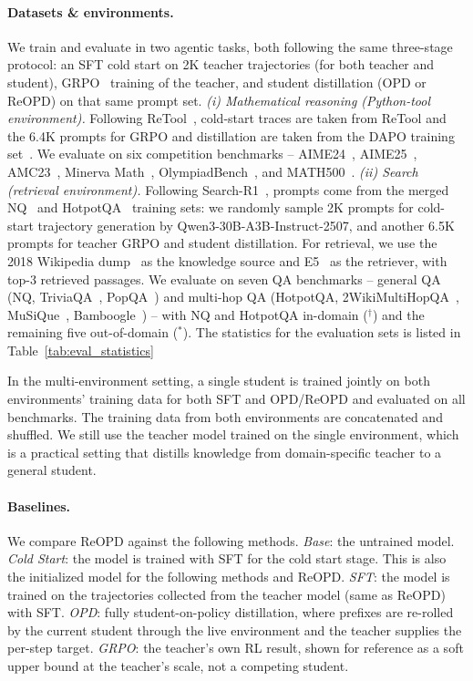 \noindent\paragraph{Datasets \& environments.}
We train and evaluate in two agentic tasks, both following the same three-stage protocol: an SFT cold start on 2K teacher trajectories (for both teacher and student), GRPO~\citep{shao2024deepseekmath} training of the teacher, and student distillation (OPD or ReOPD) on that same prompt set. \emph{(i) Mathematical reasoning (Python-tool environment).} Following ReTool~\citep{feng2025retool}, cold-start traces are taken from ReTool and the 6.4K prompts for GRPO and distillation are taken from the DAPO training set~\citep{yu2025dapo}. We evaluate on six competition benchmarks -- AIME24~\citep{aime24}, AIME25~\citep{aime25}, AMC23~\citep{li2024numinamath}, Minerva Math~\citep{lewkowycz2022minerva}, OlympiadBench~\citep{he2024olympiadbench}, and MATH500~\citep{hendrycks2021math500}. \emph{(ii) Search (retrieval environment).} Following Search-R1~\citep{jin2025search}, prompts come from the merged NQ~\citep{kwiatkowski2019nq} and HotpotQA~\citep{yang2018hotpotqa} training sets: we randomly sample 2K prompts for cold-start trajectory generation by Qwen3-30B-A3B-Instruct-2507, and another 6.5K prompts for teacher GRPO and student distillation. For retrieval, we use the 2018 Wikipedia dump~\citep{karpukhin2020dense} as the knowledge source and E5~\citep{wang2022text} as the retriever, with top-3 retrieved passages. We evaluate on seven QA benchmarks -- general QA (NQ, TriviaQA~\citep{joshi2017triviaqa}, PopQA~\citep{mallen2023popqa}) and multi-hop QA (HotpotQA, 2WikiMultiHopQA~\citep{ho2020twowiki}, MuSiQue~\citep{trivedi2022musique}, Bamboogle~\citep{press2023bamboogle}) -- with NQ and HotpotQA in-domain ($^\dagger$) and the remaining five out-of-domain ($^*$). The statistics for the evaluation sets is listed in Table~\ref{tab:eval_statistics}

In the multi-environment setting, a single student is trained jointly on both environments' training data for both SFT and OPD/ReOPD and evaluated on all benchmarks. The training data from both environments are concatenated and shuffled. We still use the teacher model trained on the single environment, which is a practical setting that distills knowledge from domain-specific teacher to a general student.


\noindent\paragraph{Baselines.}
We compare ReOPD against the following methods. \emph{Base}: the untrained model. \emph{Cold
Start}: the model is trained with SFT for the cold start stage. This is also the initialized model for the following methods and ReOPD. \emph{SFT}: the model is trained on the trajectories collected from the teacher model (same as ReOPD) with SFT. \emph{OPD}: fully student-on-policy distillation, where prefixes are re-rolled by the current student through the live environment and the teacher supplies the per-step target. \emph{GRPO}: the teacher's own RL result, shown for reference as a soft upper bound at the teacher's scale, not a competing student.

